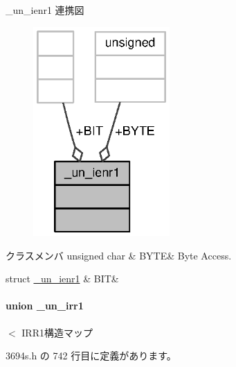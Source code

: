 \+\_\+un\+\_\+ienr1 連携図
\nopagebreak
\begin{figure}[H]
\begin{center}
\leavevmode
\includegraphics[width=148pt]{d0/def/union__un__ienr1__coll__graph}
\end{center}
\end{figure}
\begin{DoxyFields}{クラスメンバ}
unsigned char\label{3694s_8h_a48b7aadbc5f43cc56dae1b262cc37c8e}
&
B\+Y\+T\+E&
Byte Access. \\
\hline

struct \hyperlink{3694s_8h_d5/d5e/struct__un__ienr1_8BIT}{\+\_\+un\+\_\+ienr1}\label{3694s_8h_ab446bdf05f8e4a4ac2372831f94358a1}
&
B\+I\+T&
\\
\hline

\end{DoxyFields}
\label{union__un__irr1}
\paragraph{union \+\_\+un\+\_\+irr1}
$<$ I\+R\+R1構造マップ 

 3694s.\+h の 742 行目に定義があります。



